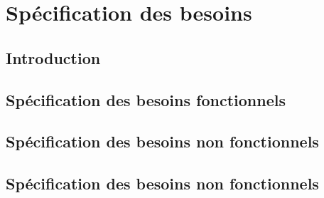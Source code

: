 \section{Spécification des besoins}
\subsection{Introduction}
\subsection{Spécification des besoins fonctionnels}
\subsection{Spécification des besoins non fonctionnels}
\subsection{Spécification des besoins non fonctionnels}

